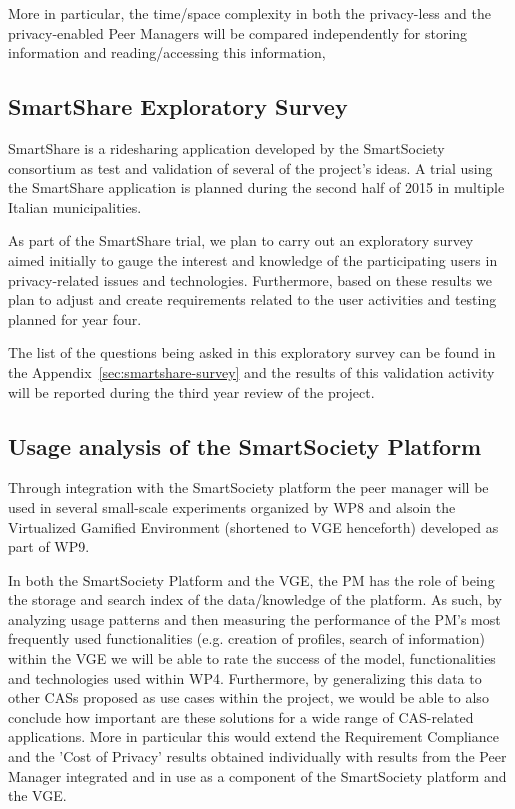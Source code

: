 More in particular, the time/space complexity in both the privacy-less and the privacy-enabled Peer Managers will be compared independently for storing information and reading/accessing this information, 

\subsection{SmartShare Exploratory Survey}
SmartShare is a ridesharing application developed by the SmartSociety consortium as test and validation of several of the project's ideas.  A trial using the SmartShare application is planned during the second half of 2015 in multiple Italian municipalities.  

As part of the SmartShare trial, we plan to carry out an exploratory survey aimed initially to gauge the interest and knowledge of the participating users in privacy-related issues and technologies. Furthermore, based on these results we plan to adjust and create requirements related to the user activities and testing planned for year four.
 
The list of the questions being asked in this exploratory survey can be found in the Appendix~\ref{sec:smartshare-survey} and the results of this validation activity will be reported during the third year review of the project.

\subsection{Usage analysis of the SmartSociety Platform}
Through integration with the SmartSociety platform the peer manager will be used in several small-scale experiments organized by WP8 and alsoin  the Virtualized Gamified Environment (shortened to VGE henceforth) developed as part of WP9.

In both the SmartSociety Platform and the VGE, the PM has the role of being the storage and search index of the data/knowledge of the platform. As such, by analyzing usage patterns and then measuring the performance of the PM's most frequently used functionalities (e.g. creation of profiles, search of information) within the VGE we will be able to rate the success of the model, functionalities and technologies used within WP4. Furthermore, by generalizing this data to other CASs proposed as use cases within the project, we would be able to also conclude how important are these solutions for a wide range of CAS-related applications. More in particular this would extend the Requirement Compliance and the 'Cost of Privacy' results obtained individually with results from the Peer Manager integrated and in use as a component of the SmartSociety platform and the VGE. 

